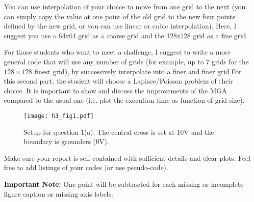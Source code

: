 \documentclass{report}
\begin{document}
\begin{enumerate}
  You can use interpolation of your choice to move from one grid to
  the next (you can simply copy the value at one point of the old grid
  to the new four points defined by the new grid, or you can use
  linear or cubic interpolation). Here, I suggest you use a 64x64 grid as a coarse grid
and the 128x128 grid as a fine grid.  

For those students who want to meet a challenge, I suggest to
write a more general code that will use any number of grids (for
example, up to 7 grids for the $128 \times 128$ finest grid), by
successively interpolate into a finer and finer grid For this second
part, the student will choose a Laplace/Poisson problem of their
choice. It is important to show and discuss the improvements of the
MGA compared to the usual one (i.e. plot the execution time as
function of grid size).
\end{enumerate}
\begin{figure}[p]
  \begin{center}
      \texttt{[image: h3\_fig1.pdf]}
  \end{center}
\caption{Setup for question 1(a). The central cross is set at 10V and the boundary is grounders (0V).}
\end{figure}


Make sure your report is self-contained with sufficient details and
clear plots. Feel free to add listings of your codes (or use
pseudo-code). 

\textbf{Important Note:} One point will be subtracted for each missing or incomplete figure caption or missing axis labels.
\end{document}
